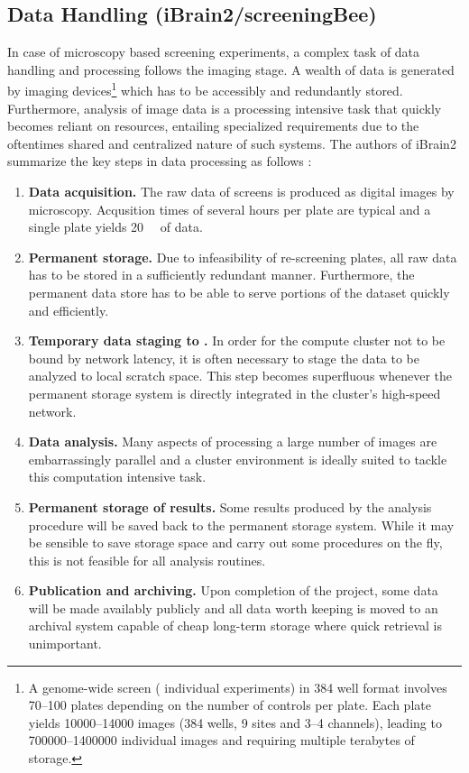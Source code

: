 \subsection{Data Handling (iBrain2\slash screeningBee)}
In case of microscopy based  screening experiments, a complex task of data handling and processing follows the imaging stage. A wealth of data is generated by imaging devices\footnote{A genome-wide screen ( individual experiments) in 384 well format involves 70--100 plates depending on the number of controls per plate. Each plate yields 10000--14000 images (384 wells, 9 sites and 3--4 channels), leading to 700000--1400000 individual images and requiring multiple terabytes of storage.} which has to be accessibly and redundantly stored. Furthermore, analysis of image data is a processing intensive task that quickly becomes reliant on  resources, entailing specialized requirements due to the oftentimes shared and centralized nature of such systems. The authors of iBrain2 summarize the key steps in   data processing as follows \citep{Rouilly2012}:
\begin{enumerate}
\item \textbf{Data acquisition.} The raw data of  screens is produced as digital images by microscopy. Acqusition times of several hours per plate are typical and a single plate yields \tilde \SI{20}{\giga\byte} of data.
\item \textbf{Permanent storage.} Due to infeasibility of re-screening plates, all raw data has to be stored in a sufficiently redundant manner. Furthermore, the permanent data store has to be able to serve portions of the dataset quickly and efficiently.
\item \textbf{Temporary data staging to .} In order for the compute cluster not to be bound by network latency, it is often necessary to stage the data to be analyzed to local scratch space. This step becomes superfluous whenever the permanent storage system is directly integrated in the cluster's high-speed network.
\item \textbf{Data analysis.} Many aspects of processing a large number of images are embarrassingly parallel and a cluster environment is ideally suited to tackle this computation intensive task.
\item \textbf{Permanent storage of results.} Some results produced by the analysis procedure will be saved back to the permanent storage system. While it may be sensible to save storage space and carry out some procedures on the fly, this is not feasible for all analysis routines.
\item \textbf{Publication and archiving.} Upon completion of the project, some data will be made availably publicly and all data worth keeping is moved to an archival system capable of cheap long-term storage where quick retrieval is unimportant.
\end{enumerate}

